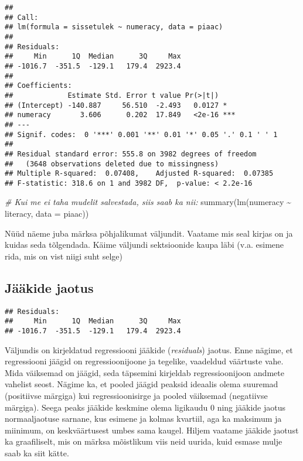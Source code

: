 \documentclass[
]{book}
\newenvironment{Shaded}{\begin{snugshade}}{\end{snugshade}}
\newcommand{\AttributeTok}[1]{\textcolor[rgb]{0.77,0.63,0.00}{#1}}
\newcommand{\CommentTok}[1]{\textcolor[rgb]{0.56,0.35,0.01}{\textit{#1}}}
\newcommand{\FunctionTok}[1]{\textcolor[rgb]{0.00,0.00,0.00}{#1}}
\newcommand{\NormalTok}[1]{#1}
\newcommand{\SpecialCharTok}[1]{\textcolor[rgb]{0.00,0.00,0.00}{#1}}
\begin{document}
\begin{verbatim}
## 
## Call:
## lm(formula = sissetulek ~ numeracy, data = piaac)
## 
## Residuals:
##     Min      1Q  Median      3Q     Max 
## -1016.7  -351.5  -129.1   179.4  2923.4 
## 
## Coefficients:
##             Estimate Std. Error t value Pr(>|t|)    
## (Intercept) -140.887     56.510  -2.493   0.0127 *  
## numeracy       3.606      0.202  17.849   <2e-16 ***
## ---
## Signif. codes:  0 '***' 0.001 '**' 0.01 '*' 0.05 '.' 0.1 ' ' 1
## 
## Residual standard error: 555.8 on 3982 degrees of freedom
##   (3648 observations deleted due to missingness)
## Multiple R-squared:  0.07408,    Adjusted R-squared:  0.07385 
## F-statistic: 318.6 on 1 and 3982 DF,  p-value: < 2.2e-16
\end{verbatim}

\begin{Shaded}
\begin{Highlighting}[]
\CommentTok{\# Kui me ei taha mudelit salvestada, siis saab ka nii:}
\FunctionTok{summary}\NormalTok{(}\FunctionTok{lm}\NormalTok{(numeracy }\SpecialCharTok{\textasciitilde{}}\NormalTok{ literacy, }\AttributeTok{data =}\NormalTok{ piaac))}
\end{Highlighting}
\end{Shaded}

Nüüd näeme juba märksa põhjalikumat väljundit. Vaatame mis seal kirjas on ja kuidas seda tõlgendada. Käime väljundi sektsioonide kaupa läbi (v.a. esimene rida, mis on vist niigi suht selge)

\hypertarget{juxe4uxe4kide-jaotus}{%
\subsection{Jääkide jaotus}\label{juxe4uxe4kide-jaotus}}

\begin{verbatim}
## Residuals:
##     Min      1Q  Median      3Q     Max 
## -1016.7  -351.5  -129.1   179.4  2923.4
\end{verbatim}

Väljundis on kirjeldatud regressiooni jääkide (\emph{residuals}) jaotus. Enne nägime, et regressiooni jäägid on regressioonijoone ja tegelike, vaadeldud väärtuste vahe. Mida väiksemad on jäägid, seda täpsemini kirjeldab regressioonijoon andmete vahelist seost. Nägime ka, et pooled jäägid peaksid ideaalis olema suuremad (positiivse märgiga) kui regressioonisirge ja pooled väiksemad (negatiivse märgiga). Seega peaks jääkide keskmine olema ligikaudu \(0\) ning jääkide jaotus normaaljaotuse sarnane, kus esimene ja kolmas kvartiil, aga ka maksimum ja miinimum, on keskväärtusest umbes sama kaugel. Hiljem vaatame jääkide jaotust ka graafiliselt, mis on märksa mõistlikum viis neid uurida, kuid esmase mulje saab ka siit kätte.
\end{document}
